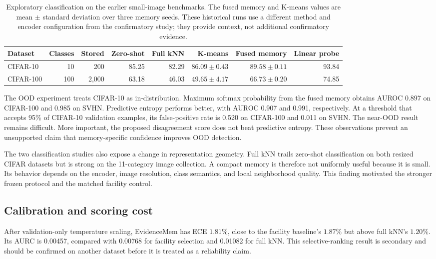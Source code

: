 \documentclass[10pt,twocolumn]{article}
\newcommand{\method}{EvidenceMem}
\begin{document}
\begin{table}[t]
\centering
\small
\caption{Exploratory classification on the earlier small-image benchmarks. The fused
memory and K-means values are mean $\pm$ standard deviation over three memory seeds.
These historical runs use a different method and encoder configuration from the
confirmatory study; they provide context, not additional confirmatory evidence.}
\label{tab:precursor}
\begin{tabular}{lrrrrrrr}
\toprule
Dataset & Classes & Stored & Zero-shot & Full kNN & K-means & Fused memory & Linear probe \\
\midrule
CIFAR-10 & 10 & 200 & 85.25 & 82.29 & $86.09\pm0.43$ & $89.58\pm0.11$ & 93.84 \\
CIFAR-100 & 100 & 2,000 & 63.18 & 46.03 & $49.65\pm4.17$ & $66.73\pm0.20$ & 74.85 \\
\bottomrule
\end{tabular}
\end{table}

The OOD experiment treats CIFAR-10 as in-distribution. Maximum softmax probability
from the fused memory obtains AUROC 0.897 on CIFAR-100 and 0.985 on SVHN. Predictive
entropy performs better, with AUROC 0.907 and 0.991, respectively. At a threshold that
accepts 95\% of CIFAR-10 validation examples, its false-positive rate is 0.520 on
CIFAR-100 and 0.011 on SVHN. The near-OOD result remains difficult. More important,
the proposed disagreement score does not beat predictive entropy. These observations
prevent an unsupported claim that memory-specific confidence improves OOD detection.

The two classification studies also expose a change in representation geometry. Full
kNN trails zero-shot classification on both resized CIFAR datasets but is strong on the
11-category image collection. A compact memory is therefore not uniformly useful
because it is small. Its behavior depends on the encoder, image resolution, class
semantics, and local neighborhood quality. This finding motivated the stronger frozen
protocol and the matched facility control.

\subsection{Calibration and scoring cost}

After validation-only temperature scaling, \method{} has ECE $1.81\%$, close to the
facility baseline's $1.87\%$ but above full kNN's $1.20\%$. Its AURC is 0.00457, compared
with 0.00768 for facility selection and 0.01082 for full kNN. This selective-ranking
result is secondary and should be confirmed on another dataset before it is treated as
a reliability claim.
\end{document}
